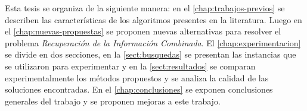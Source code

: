 Esta tesis se organiza de la siguiente manera: en el \autoref{chap:trabajos-previos} se describen las características de los algoritmos presentes en la literatura. Luego en el \autoref{chap:nuevas-propuestas} se proponen nuevas alternativas para resolver el problema {\em Recuperación de la Información Combinada}. El \autoref{chap:experimentacion} se divide en dos secciones, en la \autoref{sect:busquedas} se presentan las instancias que se utilizaron para experimentar y en la \autoref{sect:resultados} se 
comparan experimentalmente los métodos propuestos y se analiza la calidad de las soluciones encontradas. En el \autoref{chap:conclusiones} se exponen conclusiones generales del trabajo y se proponen mejoras a este trabajo.

